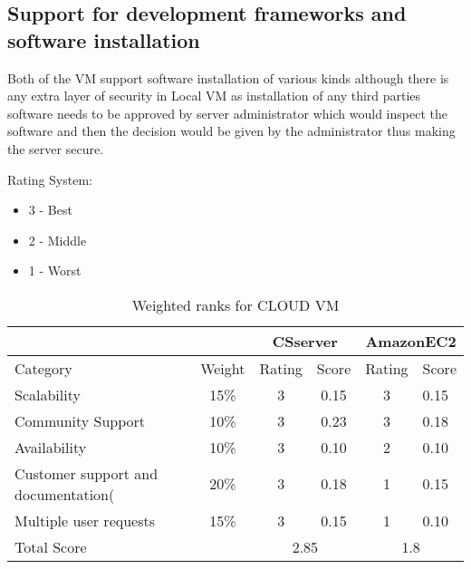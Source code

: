\documentclass{article}
\begin{document}
\subsection{Support for development frameworks and software installation}
Both of the VM support software installation of various kinds although there is any extra layer of security in Local VM as installation of any third parties software needs to be approved by server administrator which would inspect the software and then the decision would be given by the administrator thus making the server secure.



Rating System:

\begin{itemize}
    \item 3 - Best
    \item 2 - Middle
    \item 1 - Worst
\end{itemize}

\begin{table}[htbp]
\caption {Weighted ranks for CLOUD VM}
\begin{tabular}{lc|c|c|c|l|}
\cline{3-6}
                                    &        & \multicolumn{2}{c|}{CSserver} & \multicolumn{2}{c|}{AmazonEC2}  \\ \hline
\multicolumn{1}{|l|}{Category}      & Weight & Rating        & Score       & Rating       & Score   \\ \hline
\multicolumn{1}{|l|}{Scalability} & 15\%   & 3             & 0.15        & 3            & 0.15  \\ \hline
\multicolumn{1}{|l|}{Community Support} & 10\%   & 3             & 0.23        & 3            & 0.18 \\ \hline
\multicolumn{1}{|l|}{Availability}     & 10\%   & 3             & 0.10         & 2            & 0.10  \\ \hline
\multicolumn{1}{|l|}{Customer support and documentation(}  & 20\%   & 3             & 0.18        & 1            & 0.15     \\ \hline
\multicolumn{1}{|l|}{Multiple user requests}       & 15\%   & 3             & 0.15         & 1            & 0.10        \\ \hline
\multicolumn{2}{|l|}{Total Score}            & \multicolumn{2}{c|}{2.85}   & \multicolumn{2}{c|}{1.8}     \\ \hline
\end{tabular}
\end{table}
\end{document}
